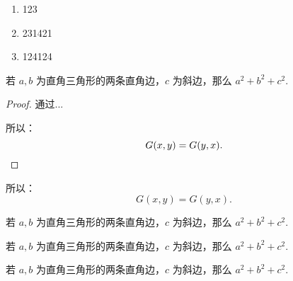 \begin{enumerate}
    \item 123
    \item 231421
    \item 124124
\end{enumerate}

\begin{theorem}[勾股定理]
    若 $a,b$ 为直角三角形的两条直角边，$c$ 为斜边，那么 $a^2 + b^2 + c^2.$
\end{theorem}

\begin{proof}
{
    通过...

    所以：
    \begin{equation*}
        G(x, y) = G(y, x).  \qedhere
    \end{equation*}
}
\end{proof}

\begin{proposition}
    所以：
    \begin{equation*}
        G(x, y) = G(y, x).
    \end{equation*}
\end{proposition}


\begin{conjecture}[勾股定理]
    若 $a,b$ 为直角三角形的两条直角边，$c$ 为斜边，那么 $a^2 + b^2 + c^2.$
\end{conjecture}

\begin{axiom}[勾股定理]
    若 $a,b$ 为直角三角形的两条直角边，$c$ 为斜边，那么 $a^2 + b^2 + c^2.$
\end{axiom}

\begin{definition}[勾股定理]
    若 $a,b$ 为直角三角形的两条直角边，$c$ 为斜边，那么 $a^2 + b^2 + c^2.$
\end{definition}




